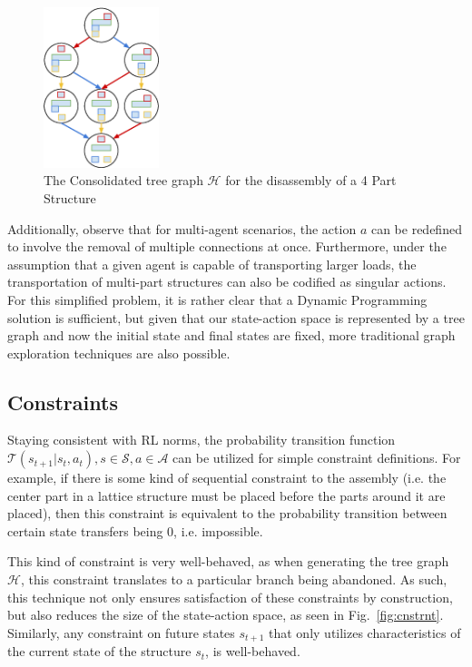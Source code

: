 \documentclass{article}
\begin{document}
\begin{figure}[!h]
\centering
\includegraphics[width=0.3\textwidth]{figs/ConsolidatedSubassemblyTreeGeneration.eps}
  \caption{The Consolidated tree graph $\mathcal{H}$ for the disassembly of a 4 Part Structure}
  \label{fig: treeGen2}
\end{figure}

Additionally, observe that for multi-agent scenarios, the action $a$ can be redefined to involve the removal of multiple connections at once. Furthermore, under the assumption that a given agent is capable of transporting larger loads, the transportation of multi-part structures can also be codified as singular actions. For this simplified problem, it is rather clear that a Dynamic Programming solution is sufficient, but given that our state-action space is represented by a tree graph and now the initial state and final states are fixed, more traditional graph exploration techniques are also possible.


\subsection{Constraints}
Staying consistent with RL norms, the probability transition function $\mathcal{T}(s_{t+1}|s_t,a_t), s\in\mathcal{S}, a\in\mathcal{A}$ can be utilized for simple constraint definitions. For example, if there is some kind of sequential constraint to the assembly (i.e. the center part in a lattice structure must be placed before the parts around it are placed), then this constraint is equivalent to the probability transition between certain state transfers being 0, i.e. impossible.

This kind of constraint is very well-behaved, as when generating the tree graph $\mathcal{H}$, this constraint translates to a particular branch being abandoned. As such, this technique not only ensures satisfaction of these constraints by construction, but also reduces the size of the state-action space, as seen in Fig.~\ref{fig:cnstrnt}. Similarly, any constraint on future states $s_{t+1}$ that only utilizes characteristics of the current state of the structure $s_t$, is well-behaved.
\end{document}

